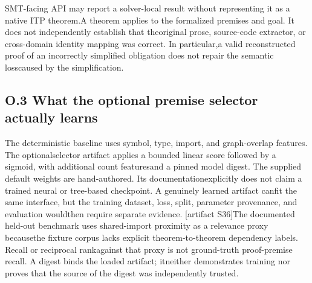 \noindent
SMT-facing API may report a solver-local result without representing it as a native ITP theorem.\linebreak[4]
[artifact S19,S37]\linebreak[4]
A theorem applies to the formalized premises and goal. It does not independently establish that the\linebreak[4]
original prose, source-code extractor, or cross-domain identity mapping was correct. In particular,\linebreak[4]
a valid reconstructed proof of an incorrectly simplified obligation does not repair the semantic loss\linebreak[4]
caused by the simplification.\par

\subsection*{O.3  What the optional premise selector actually learns}
\noindent
The deterministic baseline uses symbol, type, import, and graph-overlap features. The optional\linebreak[4]
selector artifact applies a bounded linear score followed by a sigmoid, with additional count features\linebreak[4]
and a pinned model digest. The supplied default weights are hand-authored. Its documentation\linebreak[4]
explicitly does not claim a trained neural or tree-based checkpoint. A genuinely learned artifact can\linebreak[4]
fit the same interface, but the training dataset, loss, split, parameter provenance, and evaluation would\linebreak[4]
then require separate evidence. [artifact S36]\linebreak[4]
The documented held-out benchmark uses shared-import proximity as a relevance proxy because\linebreak[4]
the fixture corpus lacks explicit theorem-to-theorem dependency labels. Recall or reciprocal rank\linebreak[4]
against that proxy is not ground-truth proof-premise recall. A digest binds the loaded artifact; it\linebreak[4]
neither demonstrates training nor proves that the source of the digest was independently trusted.\par


